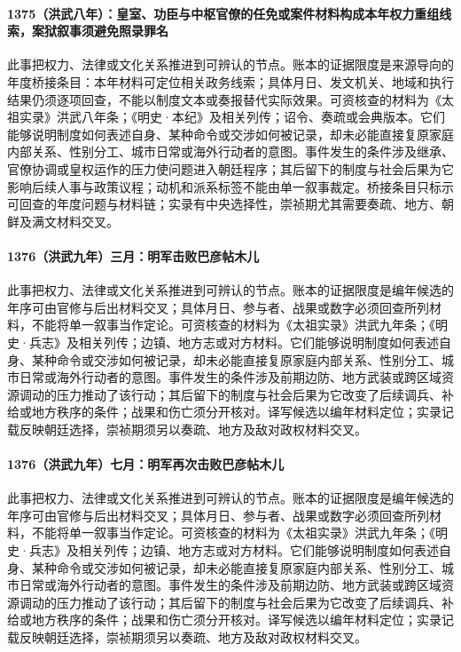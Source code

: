 \paragraph{1375（洪武八年）：皇室、功臣与中枢官僚的任免或案件材料构成本年权力重组线索，案狱叙事须避免照录罪名} 此事把权力、法律或文化关系推进到可辨认的节点。账本的证据限度是来源导向的年度桥接条目：本年材料可定位相关政务线索；具体月日、发文机关、地域和执行结果仍须逐项回查，不能以制度文本或奏报替代实际效果。可资核查的材料为《太祖实录》洪武八年条；《明史·本纪》及相关列传；诏令、奏疏或会典版本。它们能够说明制度如何表述自身、某种命令或交涉如何被记录，却未必能直接复原家庭内部关系、性别分工、城市日常或海外行动者的意图。事件发生的条件涉及继承、官僚协调或皇权运作的压力使问题进入朝廷程序；其后留下的制度与社会后果为它影响后续人事与政策议程；动机和派系标签不能由单一叙事裁定。桥接条目只标示可回查的年度问题与材料链；实录有中央选择性，崇祯期尤其需要奏疏、地方、朝鲜及满文材料交叉。

\paragraph{1376（洪武九年）三月：明军击败巴彦帖木儿} 此事把权力、法律或文化关系推进到可辨认的节点。账本的证据限度是编年候选的年序可由官修与后出材料交叉；具体月日、参与者、战果或数字必须回查所列材料，不能将单一叙事当作定论。可资核查的材料为《太祖实录》洪武九年条；《明史·兵志》及相关列传；边镇、地方志或对方材料。它们能够说明制度如何表述自身、某种命令或交涉如何被记录，却未必能直接复原家庭内部关系、性别分工、城市日常或海外行动者的意图。事件发生的条件涉及前期边防、地方武装或跨区域资源调动的压力推动了该行动；其后留下的制度与社会后果为它改变了后续调兵、补给或地方秩序的条件；战果和伤亡须分开核对。译写候选以编年材料定位；实录记载反映朝廷选择，崇祯期须另以奏疏、地方及敌对政权材料交叉。

\paragraph{1376（洪武九年）七月：明军再次击败巴彦帖木儿} 此事把权力、法律或文化关系推进到可辨认的节点。账本的证据限度是编年候选的年序可由官修与后出材料交叉；具体月日、参与者、战果或数字必须回查所列材料，不能将单一叙事当作定论。可资核查的材料为《太祖实录》洪武九年条；《明史·兵志》及相关列传；边镇、地方志或对方材料。它们能够说明制度如何表述自身、某种命令或交涉如何被记录，却未必能直接复原家庭内部关系、性别分工、城市日常或海外行动者的意图。事件发生的条件涉及前期边防、地方武装或跨区域资源调动的压力推动了该行动；其后留下的制度与社会后果为它改变了后续调兵、补给或地方秩序的条件；战果和伤亡须分开核对。译写候选以编年材料定位；实录记载反映朝廷选择，崇祯期须另以奏疏、地方及敌对政权材料交叉。

